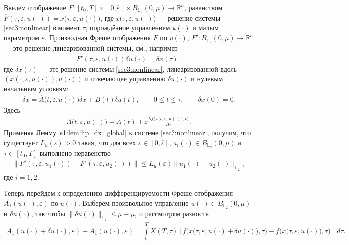 \documentclass[../main.tex]{subfiles}
\begin{document}
Введем отображение $\overline{F}: [t_0,T] \times [0,\overline{\varepsilon}] \times B_{\mathbb{L}_2}(0,\overline{\mu}) \to \mathbb{R}^n$, равенством $\overline{F}(\tau,\varepsilon, u(\cdot)) = x \big(\tau,\varepsilon, u(\cdot)\big) $, где $x \big(\tau,\varepsilon, u(\cdot)\big)$ --- решение системы \eqref{sec3:nonlinear} в момент $\tau$, порождённое управлением $u(\cdot)$ и малым параметром $\varepsilon$. 
Производная Фреше отображения $\overline{F}$ по $u(\cdot)$, $\overline{F}': B_{\mathbb{L}_2}(0,\overline{\mu}) \to \mathbb{R}^n $ --- это решение линеаризованной системы, см., например \cite{GusZyk}
\begin{gather}\label{dF}
 \overline{F}'(\tau,\varepsilon, u(\cdot)) \delta u(\cdot) = \delta x(\tau), 
\end{gather}
где $\delta x(\tau)$ --- это решение системы \eqref{sec3:nonlinear}, линеаризованной вдоль $(x(\cdot,\varepsilon, u(\cdot)), u(\cdot))$ и отвечающее управлению $\delta u(\cdot)$ и нулевым начальным условиям:
\begin{gather}\label{dx}
 \delta\dot{x} = \overline{A}\big(t,\varepsilon,u(\cdot)\big) \delta x + B(t)\delta u(t), \qquad 0\leqslant t \leqslant \tau, \qquad \delta x(0) = 0.
\end{gather}
Здесь
\begin{gather*}
 \overline{A}\big(t,\varepsilon,u(\cdot)\big) = A(t) +\varepsilon \frac{\partial f\big(x(t,\varepsilon,u(\cdot)\big),t\big)}{\partial x}.
\end{gather*}
Применяя Лемму \ref{s1:lem:lip_dx_global} к системе \eqref{sec3:nonlinear}, получим, что существует $L_u(\varepsilon) > 0$ такая, что для всех $\varepsilon\in [0,\overline{\varepsilon}]$, $u_i(\cdot) \in B_{\mathbb{L}_2}(0,\mu)$ и $\tau \in [t_0,T]$ выполнено неравенство
\begin{gather*}
	\| \overline{F}'(\tau,\varepsilon, u_1(\cdot)) - \overline{F}'(\tau,\varepsilon, u_2(\cdot)) \| \leqslant L_u(\varepsilon) \| u_1(\cdot) - u_2(\cdot) \|_{\mathbb{L}_2},
\end{gather*}
где $i = 1,2$.

Теперь перейдем к определению дифференцируемости Фреше отображения $A_1(u(\cdot),\varepsilon)$ по $u(\cdot)$.
Выберем произвольное управление $u(\cdot) \in B_{\mathbb{L}_2}(0,\mu)$ и $\delta u(\cdot)$, так чтобы $\|\delta u(\cdot)\|_{\mathbb{L}_2} \leqslant \overline{\mu}-\mu$, и рассмотрим разность
\begin{gather}\label{diff_A}
 A_1(u(\cdot) + \delta u(\cdot),\varepsilon) - A_1(u(\cdot),\varepsilon) = \int\limits_{t_0}^T X(T,\tau) \left[ 
 f\Big(x\big(\tau,\varepsilon, u(\cdot) + \delta u(\cdot)\big),\tau\Big) - 
 f\Big(x\big(\tau,\varepsilon, u(\cdot)\big),\tau\Big) \right]\ d\tau.
\end{gather}
\end{document}
